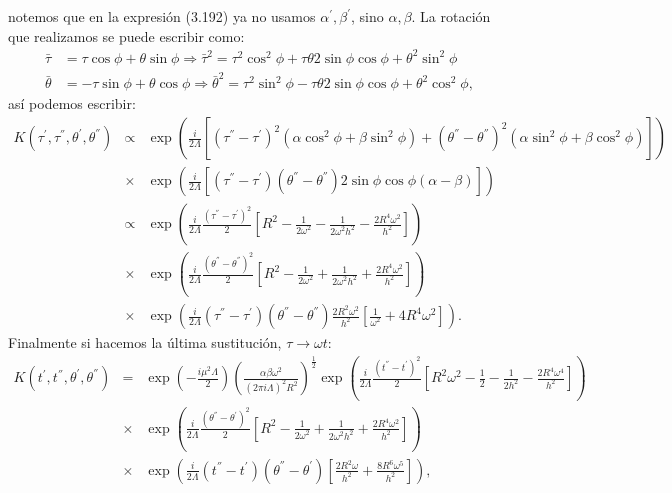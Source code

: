 notemos que en la expresión (3.192) ya no usamos $\alpha^{'},\beta^{'}$, sino $\alpha,\beta$. La rotación que realizamos se puede escribir como:
\begin{eqnarray}
\nonumber \bar{\tau}&=\tau\cos\phi+\theta\sin\phi\Rightarrow\bar{\tau}^{2}=\tau^{2}\cos^{2}\phi+\tau\theta2\sin\phi\cos\phi+\theta^{2}\sin^{2}\phi\\
\bar{\theta}&=-\tau\sin\phi+\theta\cos\phi\Rightarrow\bar{\theta}^{2}=\tau^{2}\sin^{2}\phi-\tau\theta2\sin\phi\cos\phi+\theta^{2}\cos^{2}\phi ,
\end{eqnarray} 
así podemos escribir:
\begin{eqnarray}
\nonumber K(\tau^{'},\tau^{''},\theta^{'},\theta^{''})&\propto &\exp\left(\frac{i}{2\Lambda}\left[(\tau^{''}-\tau^{'})^{2}(\alpha\cos^{2}\phi+\beta\sin^{2}\phi)+(\theta^{''}-\theta^{''})^{2}(\alpha\sin^{2}\phi+\beta\cos^{2}\phi)\right]\right)\\
\nonumber &\times & \exp\left(\frac{i}{2\Lambda}\left[(\tau^{''}-\tau^{'})(\theta^{''}-\theta^{''})2\sin\phi\cos\phi(\alpha-\beta)\right]\right)\\
\nonumber &\propto & \exp\left(\frac{i}{2\Lambda}\frac{(\tau^{''}-\tau^{'})^{2}}{2}\left[R^{2}-\frac{1}{2\omega^{2}}-\frac{1}{2\omega^{2}h^{2}}-\frac{2R^{4}\omega^{2}}{h^{2}}\right]\right)\\
\nonumber &\times & \exp\left(\frac{i}{2\Lambda}\frac{(\theta^{''}-\theta^{''})^{2}}{2}\left[R^{2}-\frac{1}{2\omega^{2}}+\frac{1}{2\omega^{2}h^{2}}+\frac{2R^{4}\omega^{2}}{h^{2}}\right]\right)\\
&\times & \exp\left(\frac{i}{2\Lambda}(\tau^{''}-\tau^{'})(\theta^{''}-\theta^{''})\frac{2R^{2}\omega^{2}}{h^{2}}\left[\frac{1}{\omega^{2}}+4R^{4}\omega^{2}\right]\right).
\end{eqnarray}
Finalmente si hacemos la última sustitución, $\tau \to \omega t$:
\begin{eqnarray}
\nonumber K(t^{'},t^{''},\theta^{'},\theta^{''})&=&\exp\left(-\frac{i\mu^{2}\Lambda}{2}\right)\left(\frac{\alpha\beta\omega^2}{(2\pi i\Lambda)^{2}R^2}\right)^{\frac{1}{2}}\exp\left(\frac{i}{2\Lambda}\frac{(t^{''}-t^{'})^{2}}{2}\left[R^{2}\omega^{2}-\frac{1}{2}-\frac{1}{2h^{2}}-\frac{2R^{4}\omega^{4}}{h^{2}}\right]\right)\\
\nonumber &\times & \exp\left(\frac{i}{2\Lambda}\frac{(\theta^{''}-\theta^{'})^{2}}{2}\left[R^{2}-\frac{1}{2\omega^{2}}+\frac{1}{2\omega^{2}h^{2}}+\frac{2R^{4}\omega^{2}}{h^{2}}\right]\right)\\
&\times &\exp\left(\frac{i}{2\Lambda}(t^{''}-t^{'})(\theta^{''}-\theta^{'})\left[\frac{2R^{2}\omega}{h^{2}}+\frac{8R^{6}\omega^{5}}{h^{2}}\right]\right),
\end{eqnarray} 
